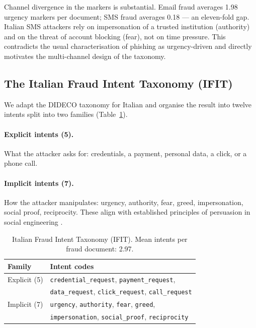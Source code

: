 \documentclass[preprint,12pt,authoryear]{elsarticle}
\begin{document}
Channel divergence in the markers is substantial. Email fraud
averages 1.98 urgency markers per document; SMS fraud averages 0.18
--- an eleven-fold gap. Italian SMS attackers rely on impersonation
of a trusted institution (authority) and on the threat of account
blocking (fear), not on time pressure. This contradicts the usual
characterisation of phishing as urgency-driven and directly
motivates the multi-channel design of the taxonomy.

\subsection{The Italian Fraud Intent Taxonomy (IFIT)}

We adapt the DIDECO taxonomy \citep{popovic2026dideco} for Italian
and organise the result into twelve intents split into two families
(Table~\ref{tab:ifit}).

\paragraph*{Explicit intents (5).} What the attacker asks for:
credentials, a payment, personal data, a click, or a phone call.

\paragraph*{Implicit intents (7).} How the attacker manipulates:
urgency, authority, fear, greed, impersonation, social proof,
reciprocity. These align with established principles of persuasion in
social engineering \citep{ferreira2015principles}.

\begin{table}[t]
\centering
\caption{Italian Fraud Intent Taxonomy (IFIT). Mean intents per
fraud document: 2.97.}
\label{tab:ifit}
\begin{tabular}{ll}
\toprule
\textbf{Family} & \textbf{Intent codes} \\
\midrule
Explicit (5) & \texttt{credential\_request}, \texttt{payment\_request}, \\
             & \texttt{data\_request}, \texttt{click\_request}, \texttt{call\_request} \\
Implicit (7) & \texttt{urgency}, \texttt{authority}, \texttt{fear}, \texttt{greed}, \\
             & \texttt{impersonation}, \texttt{social\_proof}, \texttt{reciprocity} \\
\bottomrule
\end{tabular}
\end{table}
\end{document}
